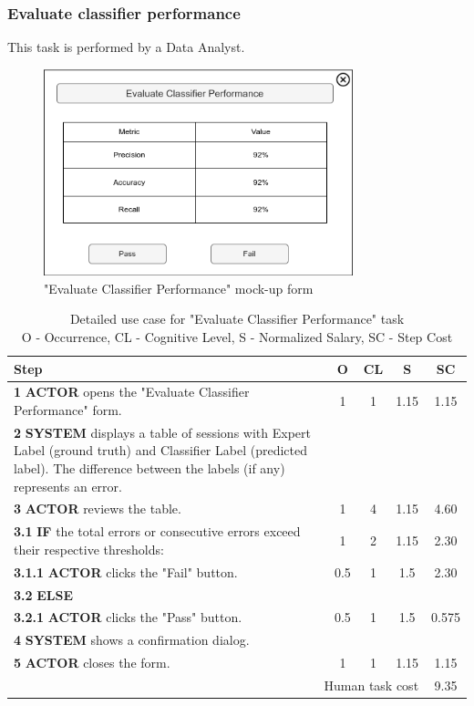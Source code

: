 \subsubsection{Evaluate classifier performance}
This task is performed by a Data Analyst.

\begin{figure}[H]
\centering
\includegraphics[width=0.8\textwidth]{figures/evaluate_classifier_performance.png}
\caption{"Evaluate Classifier Performance" mock-up form}
\end{figure}

\begin{table}[H]
\centering
\begin{tabularx}{\textwidth}{|X|c|c|c|c|}
\hline
\textbf{Step} & \textbf{O} & \textbf{CL} & \textbf{S} & \textbf{SC} \\
\hline
\textbf{1} \textbf{ACTOR} opens the "Evaluate Classifier Performance" form. & 1 & 1 & 1.15 & 1.15 \\
\hline
\textbf{2} \textbf{SYSTEM} displays a table of sessions with Expert Label (ground truth) and Classifier Label (predicted label). 
The difference between the labels (if any) represents an error. & & & & \\
\hline
\textbf{3} \textbf{ACTOR} reviews the table. & 1 & 4 & 1.15 & 4.60\\
\hline
\textbf{3.1} \textbf{IF} the total errors or consecutive errors exceed their respective thresholds: & 1 & 2 & 1.15 & 2.30 \\
\hline
\textbf{3.1.1} \textbf{ACTOR} clicks the "Fail" button. &0.5 & 1& 1.5&2.30 \\
\hline
\textbf{3.2} \textbf{ELSE} & & & & \\
\hline
\textbf{3.2.1} \textbf{ACTOR} clicks the "Pass" button. &0.5 &1 & 1.5&0.575 \\
\hline
\textbf{4} \textbf{SYSTEM} shows a confirmation dialog. & & & & \\
\hline
\textbf{5} \textbf{ACTOR} closes the form. &1 &1 &1.15 & 1.15\\
\hline
\multicolumn{4}{|r|}{Human task cost} &9.35 \\
\hline
\end{tabularx}
\caption{Detailed use case for "Evaluate Classifier Performance" task\\ 
O - Occurrence, CL - Cognitive Level, S - Normalized Salary, SC - Step Cost}
\label{table:evaluate_classifier_performance}
\end{table}

